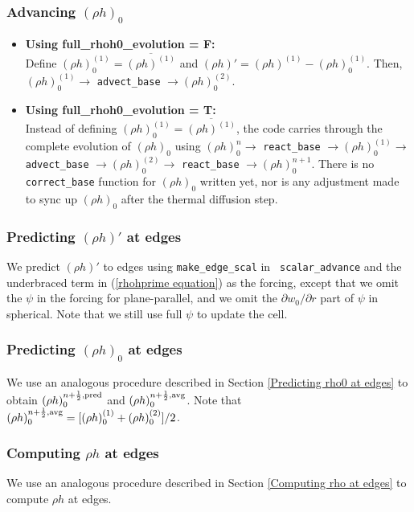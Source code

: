 \subsubsection{Advancing $(\rho h)_0$}
\begin{itemize}
\item {\bf Using full\_rhoh0\_evolution = F:}\\
 Define $(\rho h)_0^{(1)} = \overline{(\rho h)^{(1)}}$  
and $(\rho h)' = (\rho h)^{(1)}-(\rho h)_0^{(1)}$.  Then, $(\rho h)_0^{(1)} \rightarrow$ 
{\tt advect\_base} $\rightarrow (\rho h)_0^{(2)}$.
\item {\bf Using full\_rhoh0\_evolution = T:}\\
 Instead of defining $(\rho h)_0^{(1)} = \overline{(\rho h)^{(1)}}$, the code carries 
through the complete evolution of $(\rho h)_0$ using $(\rho h)_0^n \rightarrow$ 
{\tt react\_base} $\rightarrow (\rho h)_0^{(1)} \rightarrow$ {\tt advect\_base}
$\rightarrow (\rho h)_0^{(2)} \rightarrow$ {\tt react\_base} $\rightarrow (\rho h)_0^{n+1}$.  
There is no {\tt correct\_base} function for $(\rho h)_0$ written yet, nor is any 
adjustment made to sync up $(\rho h)_0$ after the thermal diffusion step.
\end{itemize}

\subsubsection{Predicting $(\rho h)'$ at edges}\label{Predicting rhohprime at edges}
We predict $(\rho h)'$ to edges using {\tt make\_edge\_scal} in {\tt
scalar\_advance} and the underbraced term in (\ref{rhohprime
equation}) as the forcing, except that we omit the $\psi$ in the
forcing for plane-parallel, and we omit the $\partial w_0/\partial r$
part of $\psi$ in spherical.  Note that we still use full $\psi$ to
update the cell.

\subsubsection{Predicting $(\rho h)_0$ at edges}
We use an analogous procedure described in Section \ref{Predicting
rho0 at edges} to obtain $(\rho h)_0^{n+\frac{1}{2},\rm{pred}}$ and $(\rho
h)_0^{n+\frac{1}{2},\rm{avg}}$.  Note that $(\rho h)_0^{n+\frac{1}{2},{\rm avg}} =
[(\rho h)_0^{(1)} + (\rho h)_0^{(2)}]/2$.

\subsubsection{Computing $\rho h$ at edges}
We use an analogous procedure described in Section \ref{Computing rho
at edges} to compute $\rho h$ at edges.

